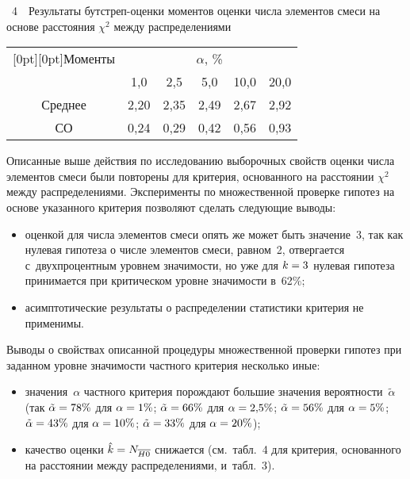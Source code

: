 \begin{multicols}{2}
\vspace*{6pt}

\addtocounter{table}{1}

{\begin{center} %
\vspace*{1pt}
{\parbox{68mm}{{\tablename~4}\ \ \small{Результаты бут\-стреп-оцен\-ки моментов оценки числа элементов смеси на основе
расстояния $\chi^2$ между распределениями}}}

\vspace*{6pt}

{\small\begin{tabular}{|c|c|c|c|c|c|}
      \hline
      \multicolumn{1}{|c|}{\raisebox{-6pt}[0pt][0pt]{Моменты}} &\multicolumn{5}{c|}{$\alpha$, \%}\\
      \cline{2-6}
 &1,0&2,5&5,0&10,0&20,0\\
\hline
Среднее &2,20&2,35&2,49&2,67&2,92\\
СО&0,24&0,29&0,42&0,56&0,93\\
\hline
\end{tabular}}
\end{center}}

\vspace*{12pt}


     Описанные выше действия по исследованию выборочных свойств оценки
числа элементов смеси были повторены для критерия, основанного на
расстоянии $\chi^2$ между распределениями. Эксперименты по множественной
проверке гипотез на основе указанного критерия позволяют сделать следующие
выводы:
     \begin{itemize}
\item оценкой для числа элементов смеси опять же может быть значение~3, так
как  нулевая гипотеза о числе элементов смеси, равном~2, отвергается с~двухпроцентным уровнем значимости, но уже для $k\hm=3$ нулевая гипотеза
принимается при критическом уровне значимости в~62\%;
\item асимптотические результаты о распределении статистики критерия не
применимы.
\end{itemize}

     Выводы о свойствах описанной процедуры множественной проверки
гипотез при заданном уровне значимости частного критерия несколько иные:
     \begin{itemize}
\item значения~$\alpha$ частного критерия порождают большие значения
вероятности~$\tilde{\alpha}$ (так $\tilde{\alpha}\hm= 78\%$ для $\alpha\hm=
1\%$; $\tilde{\alpha}\hm= 66\%$ для $\alpha\hm= 2{,}5\%$;
$\tilde{\alpha}\hm= 56\%$ для $\alpha\hm= 5\%$; $\tilde{\alpha}\hm= 43\%$
для $\alpha\hm= 10\%$; $\tilde{\alpha}\hm= 33\%$ для $\alpha\hm= 20\%$);
\item качество оценки $\hat{k}\hm= N_{\overline{H0}}$ снижается (см.\
табл.~4 для критерия, основанного на расстоянии между распределениями,
и~табл.~3).
\end{itemize}




\end{multicols}
